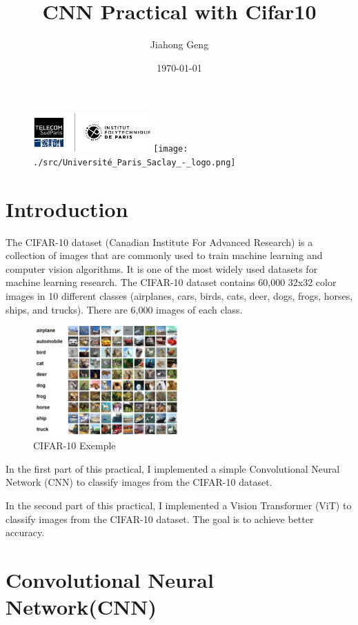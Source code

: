 \documentclass[12pt]{article}
\begin{document}
\begin{figure}
    \includegraphics[width=0.4\textwidth]{./src/logo2.png}
    \hfill
    \texttt{[image: ./src/Université\_Paris\_Saclay\_-\_logo.png]}
\end{figure}

\title{CNN Practical with Cifar10}
\author{Jiahong Geng}
\date{\today}




\maketitle
\tableofcontents
\newpage
\section{Introduction}
The CIFAR-10 dataset (Canadian Institute For Advanced Research) is a collection of images that are commonly used to train machine learning and computer vision algorithms.
It is one of the most widely used datasets for machine learning research.
The CIFAR-10 dataset contains 60,000 32x32 color images in 10 different classes (airplanes, cars, birds, cats, deer, dogs, frogs, horses, ships, and trucks). There are 6,000 images of each class.
\begin{figure}[H]
    \centering
    \includegraphics[width=0.5\textwidth]{./src/cifar10.png}
    \caption{CIFAR-10 Exemple}
\end{figure}
In the first part of this practical, I implemented a simple Convolutional Neural Network (CNN) to classify images from the CIFAR-10 dataset. 

In the second part of this practical, I implemented a Vision Transformer (ViT) to classify images from the CIFAR-10 dataset. 
The goal is to achieve better accuracy.
\section{Convolutional Neural Network(CNN)}
\end{document}
